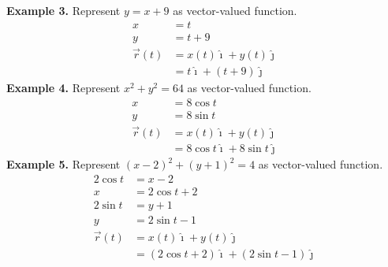 \vspace{1em}
\begin{center}
\end{center}

\newpage

\noindent\textbf{Example 3. } Represent $y = x + 9$ as vector-valued function.
\begin{align*}
    x          & = t                                   \\
    y          & = t + 9                               \\
    \vec{r}(t) & = x(t)\hat{\imath} + y(t)\hat{\jmath} \\
               & = t\hat{\imath} + (t+9)\hat{\jmath}
\end{align*}
\noindent\textbf{Example 4. } Represent $x^2 + y^2 = 64$ as vector-valued function.
\begin{align*}
    x          & = 8\cos{t}                                    \\
    y          & = 8\sin{t}                                    \\
    \vec{r}(t) & =x(t)\hat{\imath} + y(t)\hat{\jmath}          \\
               & = 8\cos{t}\hat{\imath} + 8\sin{t}\hat{\jmath}
\end{align*}
\noindent\textbf{Example 5. } Represent $(x-2)^2 + (y + 1)^2 = 4$ as vector-valued function.
\begin{align*}
    2\cos{t}   & = x - 2                                                   \\
    x          & = 2\cos{t} + 2                                            \\
    2\sin{t}   & = y + 1                                                   \\
    y          & = 2\sin{t} - 1                                            \\
    \vec{r}(t) & = x(t)\hat{\imath} + y(t)\hat{\jmath}                     \\
               & = (2\cos{t} + 2)\hat{\imath} + (2\sin{t} - 1)\hat{\jmath}
\end{align*}
